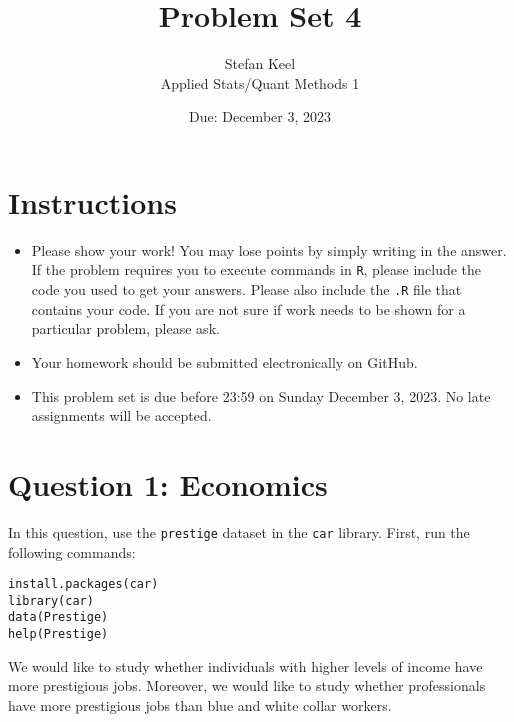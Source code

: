 \documentclass[12pt,letterpaper]{article}
\title{Problem Set 4}
\date{Due: December 3, 2023}
\author{Stefan Keel \\
	Applied Stats/Quant Methods 1}
\begin{document}
	\maketitle
	\section*{Instructions}
	\begin{itemize}
		\item Please show your work! You may lose points by simply writing in the answer. If the problem requires you to execute commands in \texttt{R}, please include the code you used to get your answers. Please also include the \texttt{.R} file that contains your code. If you are not sure if work needs to be shown for a particular problem, please ask.
		\item Your homework should be submitted electronically on GitHub.
		\item This problem set is due before 23:59 on Sunday December 3, 2023. No late assignments will be accepted.
	\end{itemize}



	\vspace{.5cm}
\section*{Question 1: Economics}
\vspace{.25cm}
\noindent 	
In this question, use the \texttt{prestige} dataset in the \texttt{car} library. First, run the following commands:

\begin{verbatim}
install.packages(car)
library(car)
data(Prestige)
help(Prestige)
\end{verbatim} 


\noindent We would like to study whether individuals with higher levels of income have more prestigious jobs. Moreover, we would like to study whether professionals have more prestigious jobs than blue and white collar workers.
\end{document}
